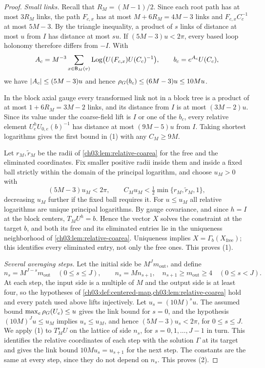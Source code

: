 \begin{proof}
\emph{Small links.} Recall that $R_M=(M-1)/2$. Since each root path has at most $3R_M$ links, the path $F_{c,x}$ has at most $M+6R_M=4M-3$ links and $F_{c,x}C_c^{-1}$ at most $5M-3$. By the triangle inequality, a product of $s$ links of distance at most $u$ from $I$ has distance at most $su$. If $(5M-3)u<2\pi$, every based loop holonomy therefore differs from $-I$. With
\[
 A_c=M^{-3}\sum_{x\in\mathsf B_M(v)}\operatorname{Log}\bigl(U(F_{c,x})U(C_c)^{-1}\bigr),\qquad b_c=e^{A_c}U(C_c),
\]
we have $\lvert A_c\rvert\le(5M-3)u$ and hence $\rho_G(b_c)\le(6M-3)u\le10Mu$.

In the block axial gauge every transformed link not in a block tree is a product of at most $1+6R_M=3M-2$ links, and its distance from $I$ is at most $(3M-2)u$. Since its value under the coarse-field lift is $I$ or one of the $b_c$, every relative element $U^h_eU_{0,e}(b)^{-1}$ has distance at most $(9M-5)u$ from $I$. Taking shortest logarithms gives the first bound in (1) with any $C_M\ge9M$.

Let $r_M,\widetilde r_M$ be the radii of \cref{ch03:lem:relative-coarea} for the free and the eliminated coordinates. Fix smaller positive radii inside them and inside a fixed ball strictly within the domain of the principal logarithm, and choose $u_M>0$ with
\[
 (5M-3)u_M<2\pi,\qquad C_Mu_M<\tfrac12\min\{r_M,\widetilde r_M,1\},
\]
decreasing $u_M$ further if the fixed ball requires it. For $u\le u_M$ all relative logarithms are unique principal logarithms. By gauge covariance, and since $h=I$ at the block centers, $T_MU^h=b$. Hence the vector $X$ solves the constraint at the target $b$, and both its free and its eliminated entries lie in the uniqueness neighborhood of \cref{ch03:lem:relative-coarea}. Uniqueness implies $X=\Gamma_b(X_{\mathrm{free}})$; this identifies every eliminated entry, not only the free ones. This proves (1).

\emph{Several averaging steps.} Let the initial side be $M^Jm_{\mathrm{out}}$, and define
\begin{equation}\label{ch04:eq:finite-shell-sides}
 n_s=M^{J-s}m_{\mathrm{out}}\quad(0\le s\le J),\qquad n_s=Mn_{s+1},\quad n_{s+1}\ge m_{\mathrm{out}}\ge4\quad(0\le s<J).
\end{equation}
At each step, the input side is a multiple of $M$ and the output side is at least four, so the hypotheses of \cref{ch03:def:centered-map,ch03:lem:relative-coarea} hold and every patch used above lifts injectively. Let $u_s=(10M)^su$. The assumed bound $\max_e\rho_G(U_e)\le u$ gives the link bound for $s=0$, and the hypothesis $(10M)^Ju\le u_M$ implies $u_s\le u_M$, and hence $(5M-3)u_s<2\pi$, for $0\le s\le J$. We apply (1) to $T_M^sU$ on the lattice of side $n_s$, for $s=0,1,\dots,J-1$ in turn. This identifies the relative coordinates of each step with the solution $\Gamma$ at its target and gives the link bound $10Mu_s=u_{s+1}$ for the next step. The constants are the same at every step, since they do not depend on $n_s$. This proves (2).


\end{proof}
